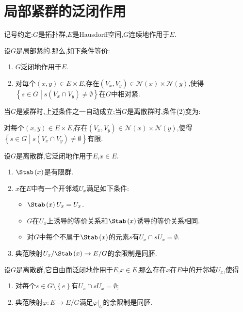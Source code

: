 \section{局部紧群的泛闭作用}

记号约定:$G$是拓扑群,$E$是Hausdorff空间,$G$连续地作用于$E$.

\begin{proposition}{}{}
	设$G$是局部紧的.那么,如下条件等价:
	\begin{enumerate}
		\item $G$泛闭地作用于$E$.
		\item 对每个$\left(x,y\right)\in E\times E$,存在$\left(V_{x},V_{y}\right)\in\mathcal{N}\left(x\right)\times\mathcal{N}\left(y\right)$,使得$\left\{s\in G\middle|s\left(V_{x}\cap V_{y}\right)\neq\emptyset\right\}$在$G$中相对紧.
	\end{enumerate}
\end{proposition}

\begin{remark}{}{}
	当$G$是紧群时,上述条件之一自动成立;当$G$是离散群时,条件(2)变为:
	\begin{center}
		对每个$\left(x,y\right)\in E\times E$,存在$\left(V_{x},V_{y}\right)\in\mathcal{N}\left(x\right)\times\mathcal{N}\left(y\right)$,使得$\left\{s\in G\middle|s\left(V_{x}\cap V_{y}\right)\neq\emptyset\right\}$有限.
	\end{center}
\end{remark}

\begin{proposition}{}{}
	设$G$是离散群,它泛闭地作用于$E$,$x\in E$.
	\begin{enumerate}
		\item $\Stab\left(x\right)$是有限群.
		\item $x$在$E$中有一个开邻域$U_{x}$满足如下条件:
		\begin{itemize}
			\item $\Stab\left(x\right)U_{x}=U_{x}$.
			\item $G$在$U_{x}$上诱导的等价关系和$\Stab\left(x\right)$诱导的等价关系相同.
			\item 对$G$中每个不属于$\Stab\left(x\right)$的元素$s$有$U_{x}\cap sU_{x}=\emptyset$.
		\end{itemize}
		\item 典范映射$U_{x}/\Stab\left(x\right)\to E/G$的余限制是同胚.
	\end{enumerate}
\end{proposition}

\begin{corollary}{}{}
	设$G$是离散群,它自由而泛闭地作用于$E$,$x\in E$,那么存在$x$在$E$中的开邻域$U_{x}$,使得
	\begin{enumerate}
		\item 对每个$s\in G\setminus\left\{e\right\}$有$U_{x}\cap sU_{x}=\emptyset$;
		\item 典范映射$\varphi:E\to E/G$满足$\varphi|_{U}$的余限制是同胚.
	\end{enumerate}
\end{corollary}

